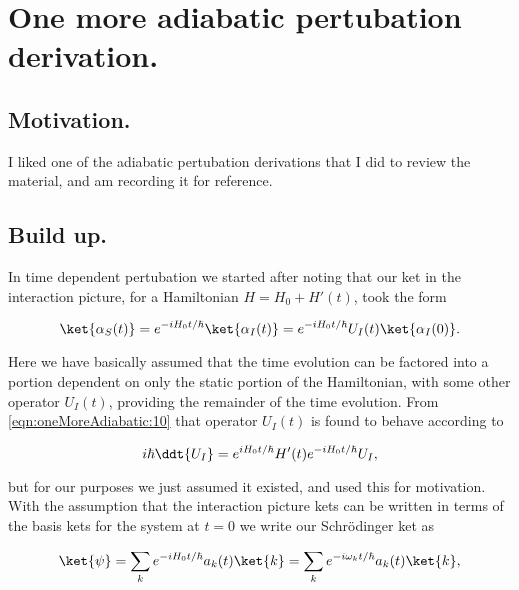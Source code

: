 
%

\chapter{One more adiabatic pertubation derivation.}
\label{chap:oneMoreAdiabatic}
{}
\date{Dec 8, 2011}

\beginArtWithToc

\section{Motivation.}

I liked one of the adiabatic pertubation derivations that I did to review the material, and am recording it for reference.

\section{Build up.}

In time dependent pertubation we started after noting that our ket in the interaction picture, for a Hamiltonian $H = H_0 + H'(t)$, took the form

\begin{equation}\label{eqn:oneMoreAdiabatic:10}
\ket{\alpha_S(t)} 
= e^{-i H_0 t/\hbar} \ket{\alpha_I(t)} = e^{-i H_0 t/\hbar} U_I(t) \ket{\alpha_I(0)}.
\end{equation}

Here we have basically assumed that the time evolution can be factored into a portion dependent on only the static portion of the Hamiltonian, with some other operator $U_I(t)$, providing the remainder of the time evolution.  From \ref{eqn:oneMoreAdiabatic:10} that operator $U_I(t)$ is found to behave according to

\begin{equation}\label{eqn:oneMoreAdiabatic:30}
i \hbar \ddt{U_I} = e^{i H_0 t/\hbar} H'(t) e^{-i H_0 t/\hbar} U_I,
\end{equation}

but for our purposes we just assumed it existed, and used this for motivation.  With the assumption that the interaction picture kets can be written in terms of the basis kets for the system at $t=0$ we write our Schr\"{o}dinger ket as 

\begin{equation}\label{eqn:oneMoreAdiabatic:40}
\ket{\psi} 
= \sum_k e^{-i H_0 t/\hbar} a_k(t) \ket{k}
= \sum_k e^{-i \omega_k t/\hbar} a_k(t) \ket{k},
\end{equation}

